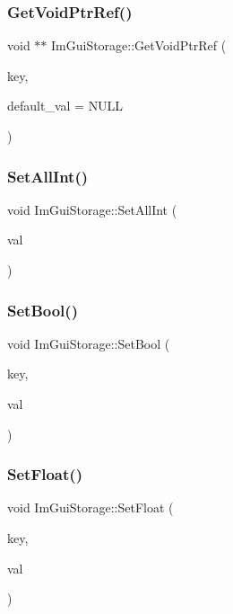 \subsubsection{\texorpdfstring{Get\+Void\+Ptr\+Ref()}{GetVoidPtrRef()}}
{\footnotesize\ttfamily void $\ast$$\ast$ Im\+Gui\+Storage\+::\+Get\+Void\+Ptr\+Ref (\begin{DoxyParamCaption}\item[{Im\+Gui\+ID}]{key,  }\item[{void $\ast$}]{default\+\_\+val = {\ttfamily NULL} }\end{DoxyParamCaption})}

\hypertarget{struct_im_gui_storage_ae5ee60618c4ce8e2b4ce0e5543d52992}{}\label{struct_im_gui_storage_ae5ee60618c4ce8e2b4ce0e5543d52992} 
\subsubsection{\texorpdfstring{Set\+All\+Int()}{SetAllInt()}}
{\footnotesize\ttfamily void Im\+Gui\+Storage\+::\+Set\+All\+Int (\begin{DoxyParamCaption}\item[{int}]{val }\end{DoxyParamCaption})}

\hypertarget{struct_im_gui_storage_ac5beee31a59b3f5294b41992717be7bf}{}\label{struct_im_gui_storage_ac5beee31a59b3f5294b41992717be7bf} 
\subsubsection{\texorpdfstring{Set\+Bool()}{SetBool()}}
{\footnotesize\ttfamily void Im\+Gui\+Storage\+::\+Set\+Bool (\begin{DoxyParamCaption}\item[{Im\+Gui\+ID}]{key,  }\item[{bool}]{val }\end{DoxyParamCaption})}

\hypertarget{struct_im_gui_storage_ab531d90a0e5a1a2453e351c499149756}{}\label{struct_im_gui_storage_ab531d90a0e5a1a2453e351c499149756} 
\subsubsection{\texorpdfstring{Set\+Float()}{SetFloat()}}
{\footnotesize\ttfamily void Im\+Gui\+Storage\+::\+Set\+Float (\begin{DoxyParamCaption}\item[{Im\+Gui\+ID}]{key,  }\item[{float}]{val }\end{DoxyParamCaption})}

